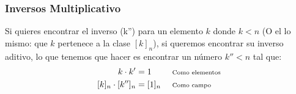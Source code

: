 \documentclass[12pt, fleqn]{report}                             %
\DeclareMathOperator \Space {\quad}                             %
\newcommand \Remember[1]{\Space\text{\scriptsize{#1}}}          %
\newenvironment{MultiLineEquation}[1]                           %
        {\begin{equation}\begin{alignedat}{#1}}                     %
        {\end{alignedat}\end{equation}}                             %
\begin{document}
            \subsubsection{Inversos Multiplicativo}

                Si quieres encontrar el inverso (k'') para un elemento $k$ donde $k < n$
                (O el lo mismo: que $k$ pertenece a la clase $[k]_n$), si queremos encontrar
                su inverso aditivo, lo que tenemos que hacer es encontrar un número $k'' < n$ tal que:
                \begin{MultiLineEquation}{3}
                    k \cdot k'          &= 1         &&\Remember{Como elementos}    \\
                    [k]_n \cdot [k'']_n &= [1]_n     &&\Remember{Como campo}
                \end{MultiLineEquation}







       
\end{document}
